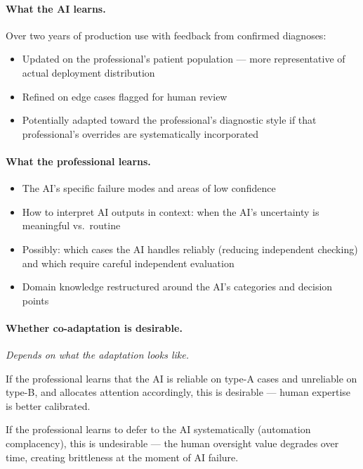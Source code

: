 \paragraph{What the AI learns.}

Over two years of production use with feedback from confirmed diagnoses:
\begin{itemize}
    \item Updated on the professional's patient population --- more representative of actual deployment distribution
    \item Refined on edge cases flagged for human review
    \item Potentially adapted toward the professional's diagnostic style if that professional's overrides are systematically incorporated
\end{itemize}

\paragraph{What the professional learns.}

\begin{itemize}
    \item The AI's specific failure modes and areas of low confidence
    \item How to interpret AI outputs in context: when the AI's uncertainty is meaningful vs.\ routine
    \item Possibly: which cases the AI handles reliably (reducing independent checking) and which require careful independent evaluation
    \item Domain knowledge restructured around the AI's categories and decision points
\end{itemize}

\paragraph{Whether co-adaptation is desirable.}

\emph{Depends on what the adaptation looks like.}

If the professional learns that the AI is reliable on type-A cases and unreliable on type-B, and allocates attention accordingly, this is desirable --- human expertise is better calibrated.

If the professional learns to defer to the AI systematically (automation complacency), this is undesirable --- the human oversight value degrades over time, creating brittleness at the moment of AI failure.

